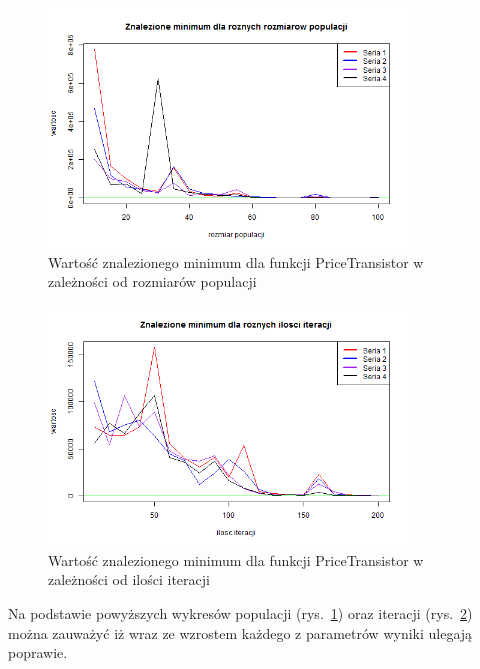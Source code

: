 \documentclass[11pt, a4paper]{article}
\newcommand{\fbi}{\leavevmode{\parindent=1em\indent}}
\begin{document}
\begin{figure}[H]
	\begin{center}
		\includegraphics[width=0.85\textwidth]{./assets/PriceTransistor4.png}
		\caption{Wartość znalezionego minimum dla funkcji PriceTransistor w zależności od rozmiarów populacji}
		\label{fig:pricetransistor4}
	\end{center}
\end{figure}

\begin{figure}[H]
	\begin{center}
		\includegraphics[width=0.85\textwidth]{./assets/PriceTransistor5.png}
		\caption{Wartość znalezionego minimum dla funkcji PriceTransistor w zależności od ilości iteracji}
		\label{fig:pricetransistor5}
	\end{center}
\end{figure}

\fbi
Na podstawie powyższych wykresów populacji (rys.~\ref{fig:pricetransistor4}) oraz iteracji (rys.~\ref{fig:pricetransistor5}) można zauważyć iż wraz ze wzrostem każdego z parametrów wyniki ulegają poprawie.
\end{document}
